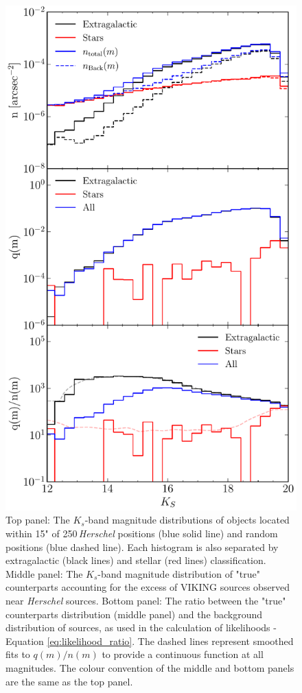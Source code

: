 \begin{figure}
    \centering
	\includegraphics[height=0.75\textheight]{Figures/true_counterparts_distribution.pdf}
	\caption{Top panel: The $K_s$-band magnitude distributions of objects located within 15" of 250\,\micron \textit{Herschel} positions (blue solid line) and random positions (blue dashed line). Each histogram is also separated by extragalactic (black lines) and stellar (red lines) classification. Middle panel: The $K_s$-band magnitude distribution of "true" counterparts accounting for the excess of VIKING sources observed near \textit{Herschel} sources. Bottom panel: The ratio between the "true" counterparts distribution (middle panel) and the background distribution of sources, as used in the calculation of likelihoods - Equation \ref{eq:likelihood_ratio}. The dashed lines represent smoothed fits to $q(m)/n(m)$ to provide a continuous function at all magnitudes. The colour convention of the middle and bottom panels are the same as the top panel.}
	\label{fig:true_counterparts_distribution}
\end{figure}

